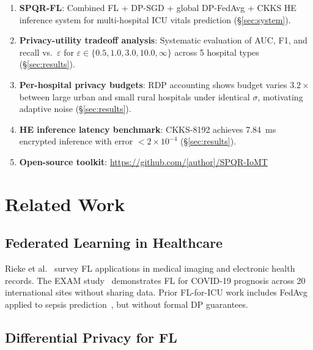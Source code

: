 \documentclass[10pt,journal,compsoc]{IEEEtran}
\begin{document}
\begin{enumerate}
\item[\textbf{C1}] \textbf{SPQR-FL}: Combined FL + DP-SGD + global
  DP-FedAvg + CKKS HE inference system for multi-hospital ICU
  vitals prediction (\S\ref{sec:system}).

\item[\textbf{C2}] \textbf{Privacy-utility tradeoff analysis}:
  Systematic evaluation of AUC, F1, and recall vs.\ $\varepsilon$
  for $\varepsilon \in \{0.5, 1.0, 3.0, 10.0, \infty\}$
  across 5 hospital types (\S\ref{sec:results}).

\item[\textbf{C3}] \textbf{Per-hospital privacy budgets}:
  RDP accounting shows budget varies $3.2\times$ between large urban
  and small rural hospitals under identical $\sigma$, motivating
  adaptive noise (\S\ref{sec:results}).

\item[\textbf{C4}] \textbf{HE inference latency benchmark}:
  CKKS-8192 achieves 7.84~ms encrypted inference with error
  $<\!2\!\times\!10^{-4}$ (\S\ref{sec:results}).

\item[\textbf{C5}] \textbf{Open-source toolkit}:
  \url{https://github.com/[author]/SPQR-IoMT}
\end{enumerate}

\section{Related Work}
\label{sec:related}

\subsection{Federated Learning in Healthcare}

Rieke et al.~\cite{rieke2020future} survey FL applications in
medical imaging and electronic health records.
The EXAM study~\cite{dayan2021federated} demonstrates FL for
COVID-19 prognosis across 20 international sites without sharing data.
Prior FL-for-ICU work includes FedAvg applied to sepsis
prediction~\cite{andreux2020siloed}, but without formal DP guarantees.

\subsection{Differential Privacy for FL}
\end{document}
